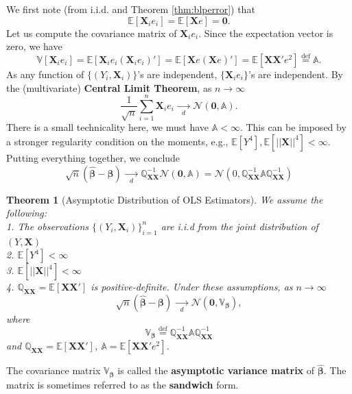 \documentclass[
]{book}
\newtheorem{theorem}{Theorem}[chapter]
\theoremstyle{definition}
\theoremstyle{definition}
\theoremstyle{definition}
\theoremstyle{definition}
\theoremstyle{remark}
\begin{document}
We first note (from i.i.d. and Theorem \ref{thm:blperror}) that
\[
{\mathbb{E}\left[ \pmb{X}_ie_i \right]}={\mathbb{E}\left[ \pmb{X}e \right]}=\pmb{0}.
\]
Let us compute the covariance matrix of \(\pmb{X}_ie_i\). Since the expectation vector is zero, we have
\[
\mathbb{V}[\pmb{X}_ie_i]={\mathbb{E}\left[ \pmb{X}_ie_i(\pmb{X}_ie_i)' \right]}={\mathbb{E}\left[ \pmb{X}e(\pmb{X}e)' \right]}={\mathbb{E}\left[ \pmb{X}\pmb{X}'e^2 \right]}\stackrel{\text{def}}{=}\mathbb{A}.
\]
As any function of \(\{(Y_i,\pmb{X}_i)\}\)'s are independent, \(\{\pmb{X}_ie_i\}\)'s are independent. By the (multivariate) \textbf{Central Limit Theorem}, as \(n\to\infty\)
\[
\frac{1}{\sqrt{n}}\sum\limits_{i=1}^n\pmb{X}_ie_i
\xrightarrow[d]{\quad\quad}\mathcal{N}(\pmb{0},\mathbb{A}).
\]
There is a small technicality here, we must have \(\mathbb{A}<\infty\). This can be imposed by a stronger regularity condition on the moments, e.g.,
\({\mathbb{E}\left[ Y^4 \right]},{\mathbb{E}\left[ ||\pmb{X}||^4 \right]}<\infty\).
Putting everything together, we conclude
\[
\sqrt{n}(\widehat{\pmb{\beta}}-\pmb{\beta})\xrightarrow[d]{\quad\quad}
\mathbb{Q}_{\pmb{XX}}^{-1}\mathcal{N}(\pmb{0},\mathbb{A})
=\mathcal{N}\left(0,\mathbb{Q}_{\pmb{XX}}^{-1}\mathbb{A}\mathbb{Q}_{\pmb{XX}}^{-1}\right)
\]

\begin{theorem}[Asymptotic Distribution of OLS Estimators]
\protect\hypertarget{thm:asympvar}{}\label{thm:asympvar}We assume the following:\\
1. The observations \(\{(Y_i,\pmb{X}_i)\}_{i=1}^n\) are i.i.d from the joint
distribution of \((Y,\pmb{X})\)\\
2. \({\mathbb{E}\left[ Y^4 \right]}<\infty\)\\
3. \({\mathbb{E}\left[ ||\pmb{X}||^4 \right]}<\infty\)\\
4. \(\mathbb{Q}_{\pmb{XX}}={\mathbb{E}\left[ \pmb{X}\pmb{X}' \right]}\) is positive-definite.
Under these assumptions, as \(n\to\infty\)
\[
\sqrt{n}(\widehat{\pmb{\beta}}-\pmb{\beta})\xrightarrow[d]{\quad\quad}
\mathcal{N}\left(\pmb{0},\mathbb{V}_{\pmb{\beta}}\right),
\]
where
\[\mathbb{V}_{\pmb{\beta}}\stackrel{\text{def}}{=}\mathbb{Q}_{\pmb{XX}}^{-1}\mathbb{A}\mathbb{Q}_{\pmb{XX}}^{-1}\]
and \(\mathbb{Q}_{\pmb{XX}}={\mathbb{E}\left[ \pmb{X}\pmb{X}' \right]}\), \(\mathbb{A}={\mathbb{E}\left[ \pmb{X}\pmb{X}'e^2 \right]}\).
\end{theorem}

The covariance matrix \(\mathbb{V}_{\pmb{\beta}}\) is called the \textbf{asymptotic variance matrix} of \(\widehat{\pmb{\beta}}\). The matrix is sometimes referred to as the \textbf{sandwich} form.
\end{document}
